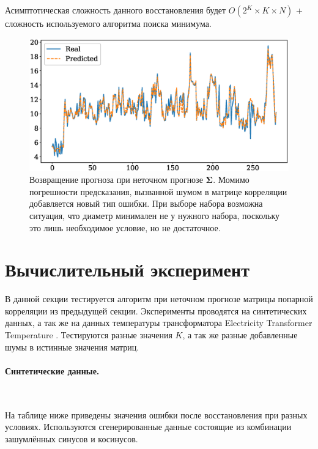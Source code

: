 \documentclass{article}
\begin{document}
Асимптотическая сложность данного восстановления будет $O(2^K \times K \times N)$ + сложность используемого алгоритма поиска минимума.

\begin{figure}[H]
	\centering
	\includegraphics[width=\textwidth]{NonIdealRecovery.eps}
	\caption{Возвращение прогноза при неточном прогнозе $\mathbf{\Sigma}$. Момимо погрешности предсказания, вызванной шумом в матрице корреляции добавляется новый тип ошибки. При выборе набора возможна ситуация, что диаметр минимален не у нужного набора, поскольку это лишь необходимое условие, но не достаточное.}
	\label{fig:fig4}
\end{figure}

\section{Вычислительный эксперимент}

В данной секции тестируется алгоритм при неточном прогнозе матрицы попарной корреляции из предыдущей секции. Эксперименты проводятся на синтетических данных, а так же на данных температуры трансформатора Electricity Transformer Temperature \cite{zhou2021informer}. Тестируются разные значения $K$, а так же разные добавленные шумы в истинные значения матриц.

\paragraph{Синтетические данные.}\

На таблице ниже приведены значения ошибки после восстановления при разных условиях. Используются сгенерированные данные состоящие из комбинации зашумлённых синусов и косинусов.
\end{document}
